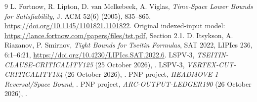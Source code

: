 \documentclass[11pt]{article}
\begin{document}
\begin{thebibliography}{9}
 L. Fortnow, R. Lipton, D. van Melkebeek, A. Viglas, \emph{Time-Space Lower Bounds for Satisfiability}, J. ACM 52(6) (2005), 835--865, \url{https://doi.org/10.1145/1101821.1101822}. Original indexed-input model: \url{https://lance.fortnow.com/papers/files/tst.pdf}, Section 2.1.
 D. Itsykson, A. Riazanov, P. Smirnov, \emph{Tight Bounds for Tseitin Formulas}, SAT 2022, LIPIcs 236, 6:1--6:21, \url{https://doi.org/10.4230/LIPIcs.SAT.2022.6}.
 LSPV-3, \emph{TSEITIN-CLAUSE-CRITICALITY125} (25 October 2026), .
 LSPV-3, \emph{VERTEX-CUT-CRITICALITY134} (26 October 2026), .
 PNP project, \emph{HEADMOVE-1 Reversal/Space Bound}, .
 PNP project, \emph{ARC-OUTPUT-LEDGER190} (26 October 2026), .
\end{thebibliography}
\end{document}
